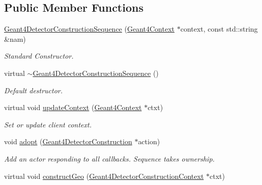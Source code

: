 \subsection*{Public Member Functions}
\begin{DoxyCompactItemize}
\item 
\hyperlink{class_d_d4hep_1_1_simulation_1_1_geant4_detector_construction_sequence_abd65d829a42c5d6e403349c9ffbb13d1}{Geant4DetectorConstructionSequence} (\hyperlink{class_d_d4hep_1_1_simulation_1_1_geant4_context}{Geant4Context} $\ast$context, const std::string \&nam)
\begin{DoxyCompactList}\small\item\em Standard Constructor. \item\end{DoxyCompactList}\item 
virtual \hyperlink{class_d_d4hep_1_1_simulation_1_1_geant4_detector_construction_sequence_a417d49c67bf4903def46532f17dd7d20}{$\sim$Geant4DetectorConstructionSequence} ()
\begin{DoxyCompactList}\small\item\em Default destructor. \item\end{DoxyCompactList}\item 
virtual void \hyperlink{class_d_d4hep_1_1_simulation_1_1_geant4_detector_construction_sequence_a2ccfc854d0b38a4b1547422c2779e346}{updateContext} (\hyperlink{class_d_d4hep_1_1_simulation_1_1_geant4_context}{Geant4Context} $\ast$ctxt)
\begin{DoxyCompactList}\small\item\em Set or update client context. \item\end{DoxyCompactList}\item 
void \hyperlink{class_d_d4hep_1_1_simulation_1_1_geant4_detector_construction_sequence_a883d0336b5983474af9479c03e90a35b}{adopt} (\hyperlink{class_d_d4hep_1_1_simulation_1_1_geant4_detector_construction}{Geant4DetectorConstruction} $\ast$action)
\begin{DoxyCompactList}\small\item\em Add an actor responding to all callbacks. Sequence takes ownership. \item\end{DoxyCompactList}\item 
virtual void \hyperlink{class_d_d4hep_1_1_simulation_1_1_geant4_detector_construction_sequence_a7c2512ab15fa66370409585d60becc99}{constructGeo} (\hyperlink{class_d_d4hep_1_1_simulation_1_1_geant4_detector_construction_context}{Geant4DetectorConstructionContext} $\ast$ctxt)

\end{DoxyCompactItemize}
